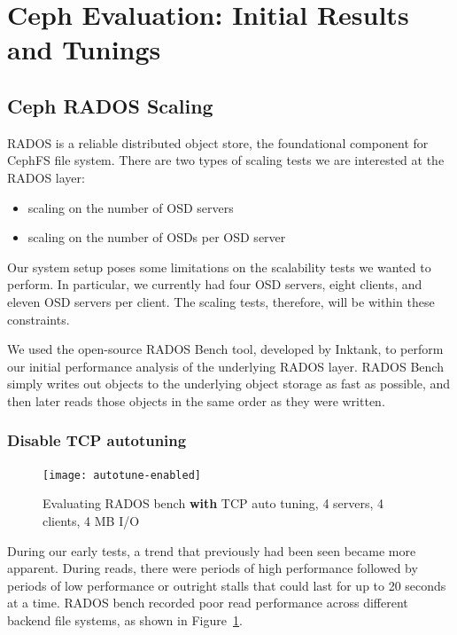 \section{Ceph Evaluation: Initial Results and Tunings}
\label{sec:ceph-initial}

\subsection{Ceph RADOS Scaling}


RADOS is a reliable distributed object store, the foundational component for
CephFS file system. There are two types of scaling tests we are interested at
the RADOS layer:

\begin{itemize}
  \item scaling on the number of OSD servers
  \item scaling on the number of OSDs per OSD server
\end{itemize}

Our system setup poses some limitations on the scalability tests we wanted to
perform. In particular, we currently had four OSD servers, eight clients, and
eleven OSD servers per client. The scaling tests, therefore, will be within
these constraints.

We used the open-source RADOS Bench tool, developed by Inktank, to perform our
initial performance analysis of the underlying RADOS layer.  RADOS Bench simply
writes out objects to the underlying object storage as fast as possible, and
then later reads those objects in the same order as they were written.

\subsubsection{Disable TCP autotuning}

\begin{figure}[htb]
\centering
\texttt{[image: autotune-enabled]}
\caption{Evaluating RADOS bench \textbf{with} TCP auto tuning, 4 servers, 4
clients, 4 MB I/O}
\label{fig:rados-tcp-autotune}
\end{figure}

During our early tests, a trend that previously had been seen became more
apparent.  During reads, there were periods of high performance followed by
periods of low performance or outright stalls that could last for up to 20
seconds at a time.  RADOS bench recorded poor read performance across
different backend file systems, as shown in
Figure~\ref{fig:rados-tcp-autotune}.


